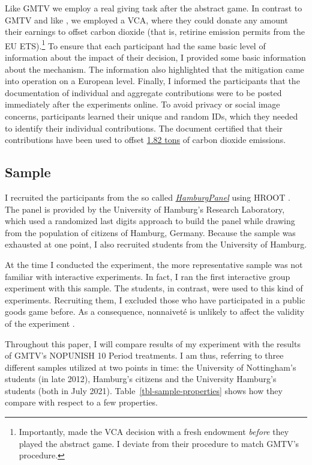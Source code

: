 \documentclass[
  authoryear,
  preprint,
  3p]{elsarticle}
\begin{document}
Like GMTV we employ a real giving task after the abstract game. In
contrast to GMTV and like \citet{GKLS2020}, we employed a VCA, where
they could donate any amount their earnings to offset carbon dioxide
(that is, retirine emission permits from the EU ETS).\footnote{Importantly,
  \citet{GKLS2020} made the VCA decision with a fresh endowment
  \emph{before} they played the abstract game. I deviate from their
  procedure to match GMTV's procedure.} To ensure that each participant
had the same basic level of information about the impact of their
decision, I provided some basic information about the mechanism. The
information also highlighted that the mitigation came into operation on
a European level. Finally, I informed the participants that the
documentation of individual and aggregate contributions were to be
posted immediately after the experiments online. To avoid privacy or
social image concerns, participants learned their unique and random IDs,
which they needed to identify their individual contributions. The
document certified that their contributions have been used to offset
\href{https://www.compensators.org/compensatelist/?searchterm=stefan+traub}{1.82
tons} of carbon dioxide emissions.

\hypertarget{sec-sample}{%
\subsection{Sample}\label{sec-sample}}

I recruited the participants from the so called
\emph{\href{https://www.wiso.uni-hamburg.de/forschung/forschungslabor/umfragelabor/aktuelle-umfragen/hamburgpanel.html}{HamburgPanel}}
using HROOT \citep{hroot}. The panel is provided by the University of
Hamburg's Research Laboratory, which used a randomized last digits
approach to build the panel while drawing from the population of
citizens of Hamburg, Germany. Because the sample was exhausted at one
point, I also recruited students from the University of Hamburg.

At the time I conducted the experiment, the more representative sample
was not familiar with interactive experiments. In fact, I ran the first
interactive group experiment with this sample. The students, in
contrast, were used to this kind of experiments. Recruiting them, I
excluded those who have participated in a public goods game before. As a
consequence, nonnaiveté is unlikely to affect the validity of the
experiment \citep[ p.~204]{GoodmanPaolacci2017}.

Throughout this paper, I will compare results of my experiment with the
results of GMTV's NOPUNISH 10 Period treatments. I am thus, referring to
three different samples utilized at two points in time: the University
of Nottingham's students (in late 2012), Hamburg's citizens and the
University Hamburg's students (both in July 2021).
Table~\ref{tbl-sample-properties} shows how they compare with respect to
a few properties.
\end{document}
